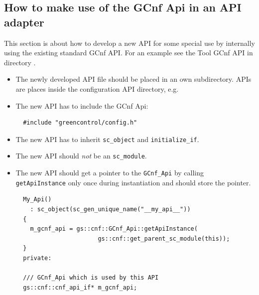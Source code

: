 


\subsection{How to make use of the GCnf Api in an API adapter}
This section is about how to develop a new API for some special use by internally using the existing standard GCnf API.
For an example see the Tool GCnf API in directory .

\begin{itemize}
  \item The newly developed API file should be placed in an own subdirectory. \GreenConfig APIs are places inside the configuration API directory, e.g. 

  \item The new API has to include the GCnf Api:
\begin{lstlisting}
  #include "greencontrol/config.h"
\end{lstlisting}

	\item The new API has to inherit \lstinline|sc_object| and \lstinline|initialize_if|.

	\item The new API should {\em not} be an \lstinline|sc_module|.

	\item The new API should get a pointer to the \lstinline|GCnf_Api| by calling \lstinline|getApiInstance| only once during instantiation and should store the pointer.
\begin{lstlisting}
  My_Api()
    : sc_object(sc_gen_unique_name("__my_api__"))
  {
    m_gcnf_api = gs::cnf::GCnf_Api::getApiInstance(
                       gs::cnf::get_parent_sc_module(this));
  }
  private:

  /// GCnf_Api which is used by this API
  gs::cnf::cnf_api_if* m_gcnf_api;
\end{lstlisting}

\end{itemize}



